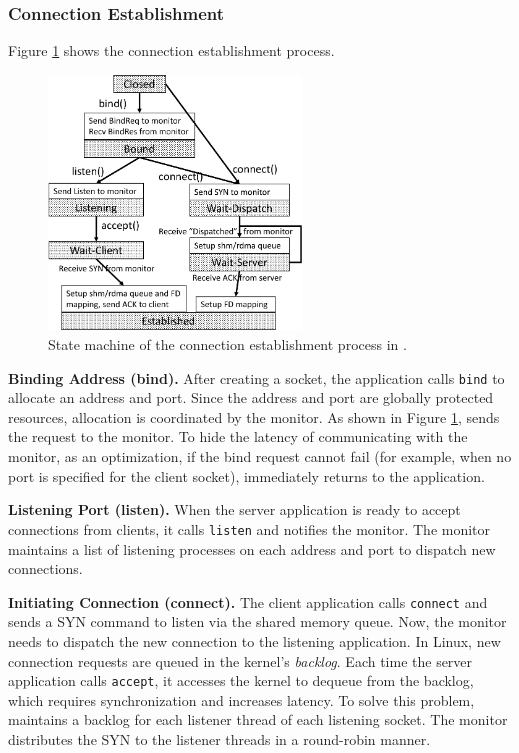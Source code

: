 \subsubsection{Connection Establishment}

Figure \ref{socksdirect:fig:conn-setup} shows the connection establishment process.

\begin{figure}[htbp]
	\centering
	\includegraphics[width=0.6\textwidth]{images/conn-setup-new}
	\caption{State machine of the connection establishment process in \libipc{}.}
	\label{socksdirect:fig:conn-setup}
\end{figure}

\textbf{Binding Address (bind).} After creating a socket, the application calls \texttt{bind} to allocate an address and port. Since the address and port are globally protected resources, allocation is coordinated by the monitor. As shown in Figure \ref{socksdirect:fig:conn-setup}, \libipc{} sends the request to the monitor. To hide the latency of communicating with the monitor, as an optimization, if the bind request cannot fail (for example, when no port is specified for the client socket), \libipc{} immediately returns to the application.

\textbf{Listening Port (listen).} When the server application is ready to accept connections from clients, it calls \texttt{listen} and notifies the monitor. The monitor maintains a list of listening processes on each address and port to dispatch new connections.

\textbf{Initiating Connection (connect).} The client application calls \texttt{connect} and sends a SYN command to listen via the shared memory queue. Now, the monitor needs to dispatch the new connection to the listening application. In Linux, new connection requests are queued in the kernel's \emph{backlog}. Each time the server application calls \texttt{accept}, it accesses the kernel to dequeue from the backlog, which requires synchronization and increases latency. To solve this problem, \sys{} maintains a backlog for each listener thread of each listening socket. The monitor distributes the SYN to the listener threads in a round-robin manner.

